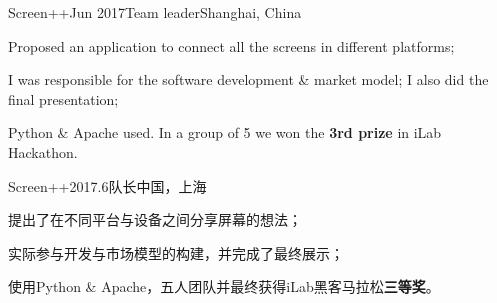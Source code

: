 \ifx\lang\eng
	\begin{rSubsection}{Screen++}{Jun 2017}{Team leader}{Shanghai, China}
		\item Proposed an application to connect all the screens in different platforms;
		\item I was responsible for the software development \& market model; I also did the final presentation;
		\item Python \& Apache used. In a group of 5 we won the \textbf{3rd prize} in iLab Hackathon.
	\end{rSubsection}
\else
	\begin{rSubsection}{Screen++}{2017.6}{队长}{中国，上海}
		\item 提出了在不同平台与设备之间分享屏幕的想法；
		\item 实际参与开发与市场模型的构建，并完成了最终展示；
		\item 使用Python \& Apache，五人团队并最终获得iLab黑客马拉松\textbf{三等奖}。
	\end{rSubsection}
\fi